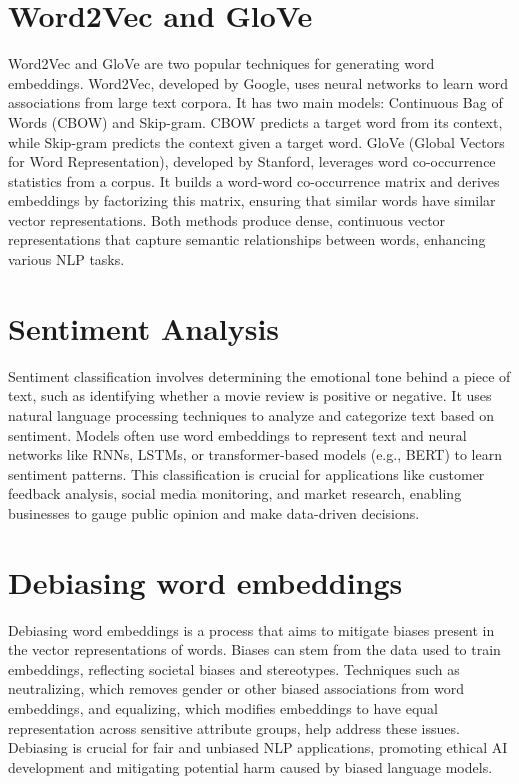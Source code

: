 \documentclass{article}
\begin{document}
\section{\Huge Word2Vec and GloVe}
Word2Vec and GloVe are two popular techniques for generating word embeddings.
Word2Vec, developed by Google, uses neural networks to learn word associations from large text corpora. It has two main models: Continuous Bag of Words (CBOW) and Skip-gram. CBOW predicts a target word from its context, while Skip-gram predicts the context given a target word.
GloVe (Global Vectors for Word Representation), developed by Stanford, leverages word co-occurrence statistics from a corpus. It builds a word-word co-occurrence matrix and derives embeddings by factorizing this matrix, ensuring that similar words have similar vector representations.
Both methods produce dense, continuous vector representations that capture semantic relationships between words, enhancing various NLP tasks.

\section{\Huge Sentiment Analysis}
Sentiment classification involves determining the emotional tone behind a piece of text, such as identifying whether a movie review is positive or negative. It uses natural language processing techniques to analyze and categorize text based on sentiment. Models often use word embeddings to represent text and neural networks like RNNs, LSTMs, or transformer-based models (e.g., BERT) to learn sentiment patterns. This classification is crucial for applications like customer feedback analysis, social media monitoring, and market research, enabling businesses to gauge public opinion and make data-driven decisions.

\section{\Huge Debiasing word embeddings}
Debiasing word embeddings is a process that aims to mitigate biases present in the vector representations of words. Biases can stem from the data used to train embeddings, reflecting societal biases and stereotypes. Techniques such as neutralizing, which removes gender or other biased associations from word embeddings, and equalizing, which modifies embeddings to have equal representation across sensitive attribute groups, help address these issues. Debiasing is crucial for fair and unbiased NLP applications, promoting ethical AI development and mitigating potential harm caused by biased language models.
\end{document}

